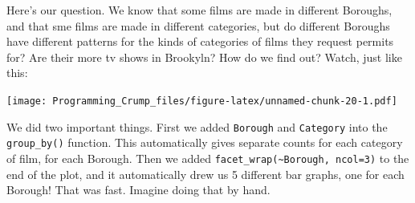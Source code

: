 \documentclass[]{book}
\newenvironment{Shaded}{\begin{snugshade}}{\end{snugshade}}
\newcommand{\KeywordTok}[1]{\textcolor[rgb]{0.13,0.29,0.53}{\textbf{{#1}}}}
\newcommand{\DataTypeTok}[1]{\textcolor[rgb]{0.13,0.29,0.53}{{#1}}}
\newcommand{\DecValTok}[1]{\textcolor[rgb]{0.00,0.00,0.81}{{#1}}}
\newcommand{\StringTok}[1]{\textcolor[rgb]{0.31,0.60,0.02}{{#1}}}
\newcommand{\CommentTok}[1]{\textcolor[rgb]{0.56,0.35,0.01}{\textit{{#1}}}}
\newcommand{\NormalTok}[1]{{#1}}
\theoremstyle{definition}
\theoremstyle{definition}
\theoremstyle{definition}
\theoremstyle{remark}
\begin{document}
Here's our question. We know that some films are made in different
Boroughs, and that sme films are made in different categories, but do
different Boroughs have different patterns for the kinds of categories
of films they request permits for? Are their more tv shows in Brookyln?
How do we find out? Watch, just like this:

\begin{Shaded}
\end{Shaded}

\texttt{[image: Programming\_Crump\_files/figure-latex/unnamed-chunk-20-1.pdf]}

We did two important things. First we added \texttt{Borough} and
\texttt{Category} into the \texttt{group\_by()} function. This
automatically gives separate counts for each category of film, for each
Borough. Then we added
\texttt{facet\_wrap(\textasciitilde{}Borough,\ ncol=3)} to the end of
the plot, and it automatically drew us 5 different bar graphs, one for
each Borough! That was fast. Imagine doing that by hand.
\end{document}
